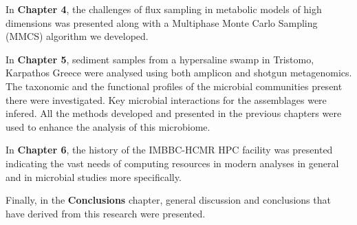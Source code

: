 In \textbf{Chapter 4}, the challenges of flux sampling in metabolic models of high dimensions was presented along with a Multiphase Monte Carlo Sampling (MMCS) algorithm we developed. 

In \textbf{Chapter 5}, sediment samples from a hypersaline swamp in Tristomo, Karpathos Greece were analysed using both amplicon and shotgun metagenomics. 
The taxonomic and the functional profiles of the microbial communities present there were investigated. 
Key microbial interactions for the assemblages were infered. 
All the methods developed and presented in the previous chapters were used to enhance the analysis of this microbiome.

In \textbf{Chapter 6}, the history of the IMBBC-HCMR HPC facility was presented indicating the vast needs of computing resources in modern analyses in general and in microbial studies more specifically. 


Finally, in the \textbf{Conclusions} chapter, general discussion and conclusions that have derived from this research were presented. 

